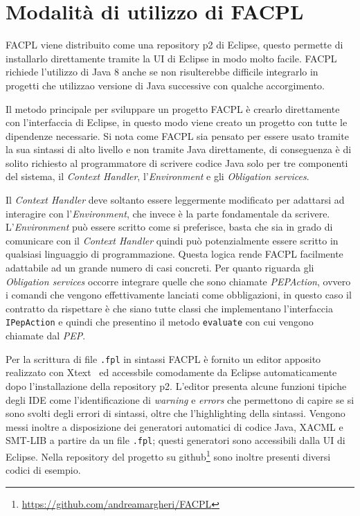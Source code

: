 \section{Modalità di utilizzo di FACPL}
FACPL viene distribuito come una repository p2 di Eclipse, questo permette di installarlo direttamente tramite la UI di Eclipse in modo molto facile. FACPL richiede l'utilizzo di Java 8 anche se non risulterebbe difficile integrarlo in progetti che utilizzao versione di Java successive con qualche accorgimento.\par
Il metodo principale per sviluppare un progetto FACPL è crearlo direttamente con l'interfaccia di Eclipse, in questo modo viene creato un progetto con tutte le dipendenze necessarie. Si nota come FACPL sia pensato per essere usato tramite la sua sintassi di alto livello e non tramite Java direttamente, di conseguenza è di solito richiesto al programmatore di scrivere codice Java solo per tre componenti del sistema, il \emph{Context Handler}, l'\emph{Environment} e gli \emph{Obligation services}.\par
Il \emph{Context Handler} deve soltanto essere leggermente modificato per adattarsi ad interagire con l'\emph{Environment}, che invece è la parte fondamentale da scrivere. L'\emph{Environment} può essere scritto come si preferisce, basta che sia in grado di comunicare con il \emph{Context Handler} quindi può potenzialmente essere scritto in qualsiasi linguaggio di programmazione. Questa logica rende FACPL facilmente adattabile ad un grande numero di casi concreti. Per quanto riguarda gli \emph{Obligation services} occorre integrare quelle che sono chiamate \emph{PEPAction}, ovvero i comandi che vengono effettivamente lanciati come obbligazioni, in questo caso il contratto da rispettare è che siano tutte classi che implementano l'interfaccia \texttt{IPepAction} e quindi che presentino il metodo \texttt{evaluate} con cui vengono chiamate dal \emph{PEP}.\par
Per la scrittura di file \texttt{.fpl} in sintassi FACPL è fornito un editor apposito realizzato con Xtext~\cite{eclipseXtext} ed accessbile comodamente da Eclipse automaticamente dopo l'installazione della repository p2. L'editor presenta alcune funzioni tipiche degli IDE come l'identificazione di \emph{warning} e \emph{errors} che permettono di capire se si sono svolti degli errori di sintassi, oltre che l'highlighting della sintassi. Vengono messi inoltre a disposizione dei generatori automatici di codice Java, XACML e SMT-LIB a partire da un file \texttt{.fpl}; questi generatori sono accessibili dalla UI di Eclipse. Nella repository del progetto su github\footnote{\url{https://github.com/andreamargheri/FACPL}} sono inoltre presenti diversi codici di esempio.\par

